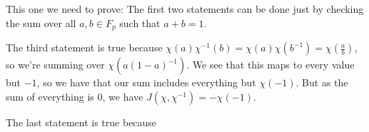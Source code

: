 \documentclass{article}
\begin{document}
	This one we need to prove: The first two statements can be done just by checking the sum over all $a, b \in F_p$ such that $a + b = 1$. 

	The third statement is true because $\chi(a) \chi^{-1}(b) = \chi(a) \chi(b^{-1}) = \chi\left(\frac{a}{b}\right)$, so we're summing over $\chi(a(1-a)^{-1})$. We see that this maps to every value but $-1$, so we have that our sum includes everything but $\chi(-1)$. But as the sum of everything is $0$, we have $J(\chi, \chi^{-1}) = -\chi(-1)$.

	The last statement is true because 
\end{document}
